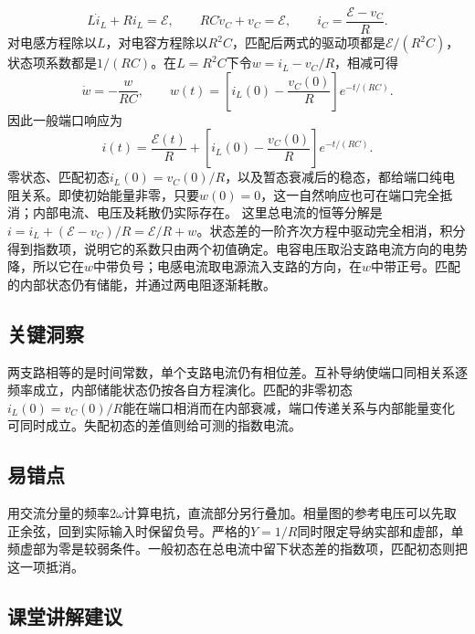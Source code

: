 \documentclass[UTF8,fontset=fandol,a4paper,11pt]{ctexart}
\begin{document}
\[
L\dot i_L+Ri_L=\mathcal E,\qquad
RC\dot v_C+v_C=\mathcal E,\qquad
i_C=\frac{\mathcal E-v_C}{R}.
\]
对电感方程除以$L$，对电容方程除以$R^2C$，匹配后两式的驱动项都是$\mathcal E/(R^2C)$，状态项系数都是$1/(RC)$。在$L=R^2C$下令$w=i_L-v_C/R$，相减可得
\[
\dot w=-\frac{w}{RC},\qquad
w(t)=\left[i_L(0)-\frac{v_C(0)}R\right]e^{-t/(RC)}.
\]
因此一般端口响应为
\[
\boxed{i(t)=\frac{\mathcal E(t)}R+
\left[i_L(0)-\frac{v_C(0)}R\right]e^{-t/(RC)}}.
\]
零状态、匹配初态$i_L(0)=v_C(0)/R$，以及暂态衰减后的稳态，都给端口纯电阻关系。即使初始能量非零，只要$w(0)=0$，这一自然响应也可在端口完全抵消；内部电流、电压及耗散仍实际存在。
这里总电流的恒等分解是$i=i_L+(\mathcal E-v_C)/R=\mathcal E/R+w$。状态差的一阶齐次方程中驱动完全相消，积分得到指数项，说明它的系数只由两个初值确定。电容电压取沿支路电流方向的电势降，所以它在$w$中带负号；电感电流取电源流入支路的方向，在$w$中带正号。匹配的内部状态仍有储能，并通过两电阻逐渐耗散。





\subsection*{关键洞察}

两支路相等的是时间常数，单个支路电流仍有相位差。互补导纳使端口同相关系逐频率成立，内部储能状态仍按各自方程演化。匹配的非零初态$i_L(0)=v_C(0)/R$能在端口相消而在内部衰减，端口传递关系与内部能量变化可同时成立。失配初态的差值则给可测的指数电流。



\subsection*{易错点}

用交流分量的频率$2\omega$计算电抗，直流部分另行叠加。相量图的参考电压可以先取正余弦，回到实际输入时保留负号。严格的$Y=1/R$同时限定导纳实部和虚部，单频虚部为零是较弱条件。一般初态在总电流中留下状态差的指数项，匹配初态则把这一项抵消。



\subsection*{课堂讲解建议}
\end{document}
